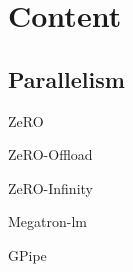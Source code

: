 \section{Content}
\subsection{Parallelism}
ZeRO~\cite{zero}

ZeRO-Offload~\cite{zero-offload}

ZeRO-Infinity~\cite{zero-infinity}\

Megatron-lm~\cite{megatron-lm}

GPipe~\cite{gpipe}
\label{sect:introv1}